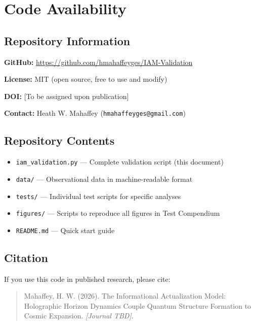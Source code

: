 \documentclass[11pt]{article}
\begin{document}
\section{Code Availability}

\subsection{Repository Information}

\textbf{GitHub:} \url{https://github.com/hmahaffeyges/IAM-Validation}

\textbf{License:} MIT (open source, free to use and modify)

\textbf{DOI:} [To be assigned upon publication]

\textbf{Contact:} Heath W. Mahaffey (\texttt{hmahaffeyges@gmail.com})

\subsection{Repository Contents}

\begin{itemize}
    \item \texttt{iam\_validation.py} — Complete validation script (this document)
    \item \texttt{data/} — Observational data in machine-readable format
    \item \texttt{tests/} — Individual test scripts for specific analyses
    \item \texttt{figures/} — Scripts to reproduce all figures in Test Compendium
    \item \texttt{README.md} — Quick start guide
\end{itemize}

\subsection{Citation}

If you use this code in published research, please cite:

\begin{quote}
Mahaffey, H. W. (2026). The Informational Actualization Model: Holographic Horizon Dynamics Couple Quantum Structure Formation to Cosmic Expansion. \textit{[Journal TBD]}.
\end{quote}
\end{document}
